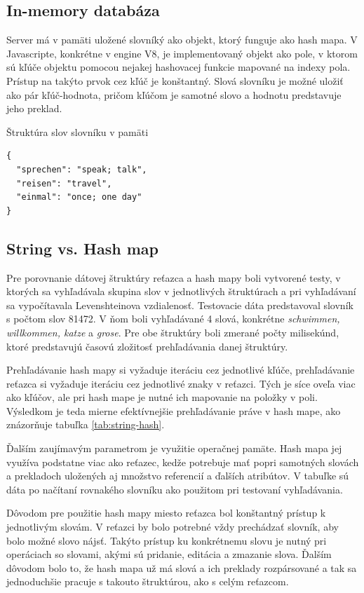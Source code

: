 \documentclass[
  digital, %
  table,   %
  lof,     %
  lot,     %
]{fithesis3}
\begin{document}
\subsection{In-memory databáza}
Server má v pamäti uložené slovníký ako objekt, ktorý funguje ako hash mapa. V Javascripte, konkrétne v engine V8, je implementovaný objekt ako pole, v ktorom sú kľúče objektu pomocou nejakej hashovacej funkcie mapované na indexy pola. Prístup na takýto prvok cez kľúč je konštantný. Slová slovníku je možné uložiť ako pár kľúč-hodnota, pričom kľúčom je samotné slovo a hodnotu predstavuje jeho preklad.

\begin{exmp}
Štruktúra slov slovníku v pamäti
\centering
\begin{lstlisting}[basicstyle=\small]
{
  "sprechen": "speak; talk",
  "reisen": "travel",
  "einmal": "once; one day"
}
\end{lstlisting}
\end{exmp}

\subsection{String vs. Hash map}
Pre porovnanie dátovej štruktúry reťazca a hash mapy boli vytvorené testy, v ktorých sa vyhľadávala skupina slov v jednotlivých štruktúrach a pri vyhľadávaní sa vypočítavala Levenshteinova vzdialenosť. Testovacie dáta predstavoval slovník s počtom slov 81472. V ňom boli vyhľadávané 4 slová, konkrétne \textit{schwimmen, willkommen, katze} a \textit{grose}. Pre obe štruktúry boli zmerané počty milisekúnd, ktoré predstavujú časovú zložitosť prehľadávania danej štruktúry.

Prehľadávanie hash mapy si vyžaduje iteráciu cez jednotlivé kľúče, prehľadávanie reťazca si vyžaduje iteráciu cez jednotlivé znaky v reťazci. Tých je síce oveľa viac ako kľúčov, ale pri hash mape je nutné ich mapovanie na položky v poli. Výsledkom je teda mierne efektívnejšie prehľadávanie práve v hash mape, ako znázorňuje tabuľka \ref{tab:string-hash}.

Ďalším zaujímavým parametrom je využitie operačnej pamäte. Hash mapa jej využíva podstatne viac ako reťazec, kedže potrebuje mať popri samotných slovách a prekladoch uložených aj množstvo referencií a ďalších atribútov. V tabuľke sú dáta po načítaní rovnakého slovníku ako použitom pri testovaní vyhľadávania.

Dôvodom pre použitie hash mapy miesto reťazca bol konštantný prístup k jednotlivým slovám. V reťazci by bolo potrebné vždy prechádzať slovník, aby bolo možné slovo nájsť. Takýto prístup ku konkrétnemu slovu je nutný pri operáciach so slovami, akými sú pridanie, editácia a zmazanie slova. Ďalším dôvodom bolo to, že hash mapa už má slová a ich preklady rozpársované a tak sa jednoduchšie pracuje s takouto štruktúrou, ako s celým reťazcom. 
\end{document}
